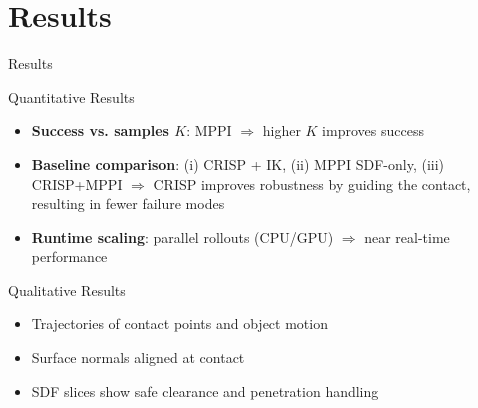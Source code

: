 \documentclass[10pt, aspectratio=169]{beamer}
\begin{document}
\section{Results}
\begin{frame}{Results}
  \begin{block}{Quantitative Results}
    \begin{itemize}
      \item \textbf{Success vs. samples $K$}: MPPI $\Rightarrow$ higher $K$ improves success
      \item \textbf{Baseline comparison}: (i) CRISP + IK, (ii) MPPI SDF-only, (iii) CRISP+MPPI $\Rightarrow$ CRISP improves robustness by guiding the contact, resulting in fewer failure modes
      \item \textbf{Runtime scaling}: parallel rollouts (CPU/GPU) $\Rightarrow$ near real-time performance
    \end{itemize}
  \end{block}

  \vspace{0.5em}

  \begin{block}{Qualitative Results}
    \begin{itemize}
      \item Trajectories of contact points and object motion
      \item Surface normals aligned at contact
      \item SDF slices show safe clearance and penetration handling
    \end{itemize}
  \end{block}
\end{frame}

\end{document}
